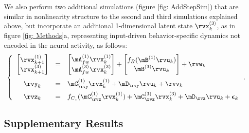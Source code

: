 \documentclass{article} %
\begin{document}
We also perform two additional simulations (figure \ref{fig: AddStepSim}) that are similar in nonlinearity structure to the second and third simulations explained above, but incorporate an additional 1-dimensional latent state \(\rvx^{(3)}_{k}\), as in figure \ref{fig: Methods}a, representing input-driven behavior-specific dynamics not encoded in the neural activity, as follows:
\begin{equation}\label{eq: simAddStep}
    \left\{
    \begin{array}{ccl}
    \begin{bmatrix}
    \rvx_{k+1}^{(1)}\\
    \rvx_{k+1}^{(3)}
    \end{bmatrix}
    &=&
    \begin{bmatrix}
    \mA_{fw}^{(1)} \rvx_{k}^{(1)}\\
    \mA_{fw}^{(3)} \rvx_{k}^{(3)}
    \end{bmatrix}
    + 
    \begin{bmatrix}
    f_B( \mB^{(1)} \rvu_{k})\\
    \mB^{(3)} \rvu_{k}
    \end{bmatrix}
    +
    \rvw_{k}
    \\[15pt] 
    \rvy_{k} &=& \mC_{\rvy}^{(1)} \rvx_{k}^{(1)} + \mD_{\rvy} \rvu_{k} + \rvv_{k}\\[5pt] %
    \rvz_{k} &=& f_{C_z}(\mC_{\rvz}^{(1)} \rvx_{k}^{(1)}) + \mC_{\rvz}^{(3)} \rvx_{k}^{(3)} + \mD_\rvz \rvu_{k} + \beps_{k}
    \end{array}
    \right.
    .
\end{equation}


\subsection{Supplementary Results}\label{app: suppResults}
\end{document}
